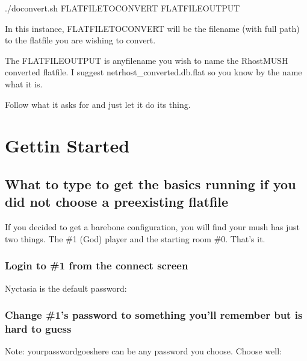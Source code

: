 \documentclass[letterpaper,10pt,english]{sphinxmanual}
\begin{document}
\sphinxAtStartPar
./doconvert.sh FLATFILETOCONVERT FLATFILEOUTPUT

\sphinxAtStartPar
In this instance, FLATFILETOCONVERT will be the filename (with full path) to
the flatfile you are wishing to convert.

\sphinxAtStartPar
The FLATFILEOUTPUT is anyfilename you wish to name the RhostMUSH converted
flatfile.  I suggest netrhost\_converted.db.flat so you know by the name
what it is.

\sphinxAtStartPar
Follow what it asks for and just let it do its thing.


\section{Gettin Started}
\label{\detokenize{gettingstarted:gettin-started}}\label{\detokenize{gettingstarted::doc}}

\subsection{What to type to get the basics running if you did not choose a pre\sphinxhyphen{}existing flatfile}
\label{\detokenize{gettingstarted:what-to-type-to-get-the-basics-running-if-you-did-not-choose-a-pre-existing-flatfile}}
\sphinxAtStartPar
If you decided to get a bare\sphinxhyphen{}bone configuration, you will find your mush has just two things.  The \#1 (God) player and the starting room \#0.  That’s it.


\subsubsection{Login to \#1 from the connect screen}
\label{\detokenize{gettingstarted:login-to-1-from-the-connect-screen}}
\sphinxAtStartPar
Nyctasia is the default password:

\begin{sphinxVerbatim}[commandchars=\\\{\}]
 
\end{sphinxVerbatim}


\subsubsection{Change \#1’s password to something you’ll remember but is hard to guess}
\label{\detokenize{gettingstarted:change-1-s-password-to-something-you-ll-remember-but-is-hard-to-guess}}
\sphinxAtStartPar
Note: yourpasswordgoeshere can be any password you choose.  Choose well:
\end{document}
